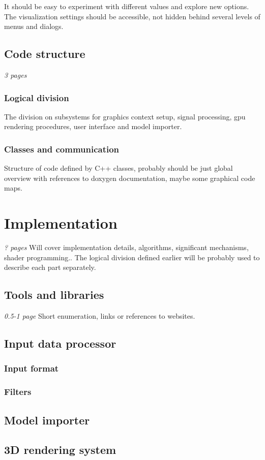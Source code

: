 It should be easy to experiment with different values and explore new options.
The visualization settings should be accessible, not hidden behind several
levels of menus and dialogs.
\section{Code structure}
\emph{3 pages}
\subsection{Logical division}
The division on subsystems for graphics context setup, signal processing, gpu
rendering procedures, user interface and model importer.
\subsection{Classes and communication}
Structure of code defined by C++ classes, probably should be just global
overview with references to doxygen documentation, maybe some graphical code
maps.
\chapter{Implementation}
\label{implementation}
\emph{? pages}
Will cover implementation details, algorithms, significant mechanisms, shader
programming.. The logical division defined earlier will be probably used to
describe each part separately.
\section{Tools and libraries}
\emph{0.5-1 page}
Short enumeration, links or references to websites.
\section{Input data processor}
\subsection{Input format}
\subsection{Filters}
\section{Model importer}
\section{3D rendering system}

